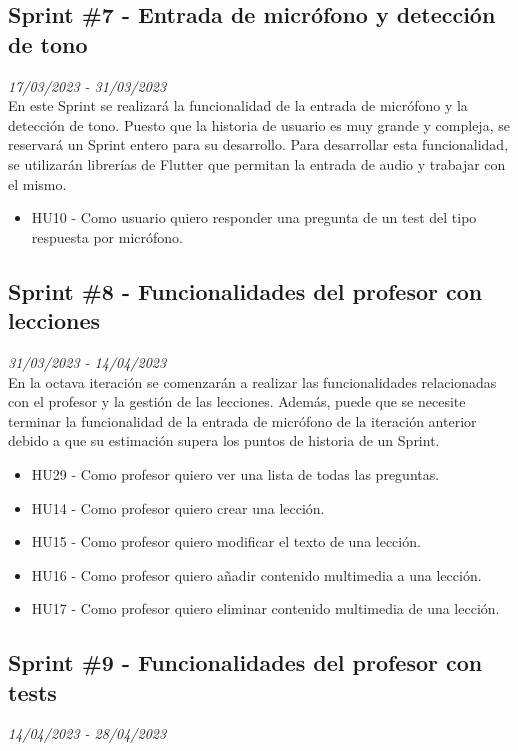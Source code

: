 \subsection{Sprint \#7 - Entrada de micrófono y detección de tono}
\textit{17/03/2023   -   31/03/2023}\\

En este Sprint se realizará la funcionalidad de la entrada de micrófono y la detección de tono. Puesto que la historia de usuario es muy grande y compleja, se reservará
un Sprint entero para su desarrollo. Para desarrollar esta funcionalidad, se utilizarán librerías de Flutter que permitan la entrada de audio y trabajar con el mismo.
\begin{itemize}
    \item HU10 - Como usuario quiero responder una pregunta de un test del tipo respuesta por micrófono.
\end{itemize}

\newpage
\subsection{Sprint \#8 - Funcionalidades del profesor con lecciones}
\textit{31/03/2023   -   14/04/2023}\\

En la octava iteración se comenzarán a realizar las funcionalidades relacionadas con el profesor y la gestión de las lecciones.
Además, puede que se necesite terminar la funcionalidad de la entrada de micrófono de la iteración anterior debido a que su estimación
supera los puntos de historia de un Sprint.


\begin{itemize}
    \item HU29 - Como profesor quiero ver una lista de todas las preguntas.
    \item HU14 - Como profesor quiero crear una lección.
    \item HU15 - Como profesor quiero modificar el texto de una lección.
    \item HU16 - Como profesor quiero añadir contenido multimedia a una lección.
    \item HU17 - Como profesor quiero eliminar contenido multimedia de una lección.
\end{itemize}

\subsection{Sprint \#9 - Funcionalidades del profesor con tests}
\textit{14/04/2023   -   28/04/2023}\\

